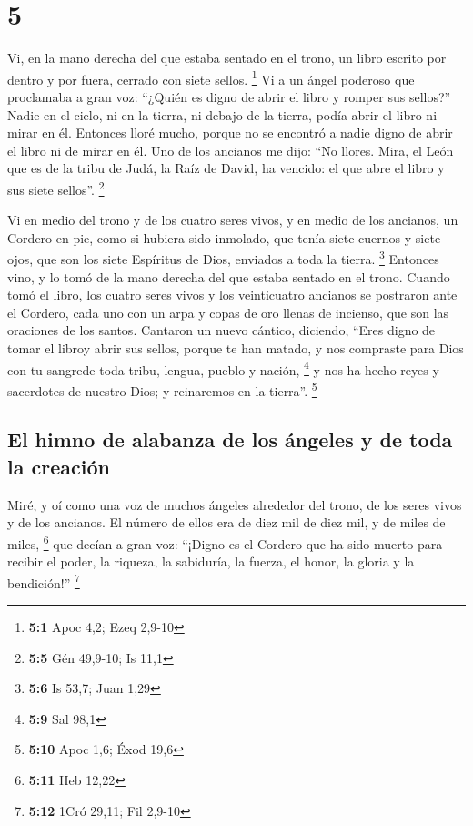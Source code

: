 \hypertarget{section-4}{%
\section{5}\label{section-4}}

 Vi, en la mano derecha del que estaba sentado en el
trono, un libro escrito por dentro y por fuera, cerrado con siete
sellos. \footnote{\textbf{5:1} Apoc 4,2; Ezeq 2,9-10}  Vi
a un ángel poderoso que proclamaba a gran voz: ``¿Quién es digno de
abrir el libro y romper sus sellos?''  Nadie en el cielo,
ni en la tierra, ni debajo de la tierra, podía abrir el libro ni mirar
en él.  Entonces lloré mucho, porque no se encontró a
nadie digno de abrir el libro ni de mirar en él.  Uno de
los ancianos me dijo: ``No llores. Mira, el León que es de la tribu de
Judá, la Raíz de David, ha vencido: el que abre el libro y sus siete
sellos''. \footnote{\textbf{5:5} Gén 49,9-10; Is 11,1}

 Vi en medio del trono y de los cuatro seres vivos, y en
medio de los ancianos, un Cordero en pie, como si hubiera sido inmolado,
que tenía siete cuernos y siete ojos, que son los siete Espíritus de
Dios, enviados a toda la tierra. \footnote{\textbf{5:6} Is 53,7; Juan
  1,29}  Entonces vino, y lo tomó de la mano derecha del
que estaba sentado en el trono.  Cuando tomó el libro, los
cuatro seres vivos y los veinticuatro ancianos se postraron ante el
Cordero, cada uno con un arpa y copas de oro llenas de incienso, que son
las oraciones de los santos.  Cantaron un nuevo cántico,
diciendo, ``Eres digno de tomar el libroy abrir sus sellos, porque te
han matado, y nos compraste para Dios con tu sangrede toda tribu,
lengua, pueblo y nación, \footnote{\textbf{5:9} Sal 98,1}
 y nos ha hecho reyes y sacerdotes de nuestro Dios; y
reinaremos en la tierra''. \footnote{\textbf{5:10} Apoc 1,6; Éxod 19,6}

\hypertarget{el-himno-de-alabanza-de-los-uxe1ngeles-y-de-toda-la-creaciuxf3n}{%
\subsection{El himno de alabanza de los ángeles y de toda la
creación}\label{el-himno-de-alabanza-de-los-uxe1ngeles-y-de-toda-la-creaciuxf3n}}

 Miré, y oí como una voz de muchos ángeles alrededor del
trono, de los seres vivos y de los ancianos. El número de ellos era de
diez mil de diez mil, y de miles de miles, \footnote{\textbf{5:11} Heb
  12,22}  que decían a gran voz: ``¡Digno es el Cordero
que ha sido muerto para recibir el poder, la riqueza, la sabiduría, la
fuerza, el honor, la gloria y la bendición!'' \footnote{\textbf{5:12}
  1Cró 29,11; Fil 2,9-10}

